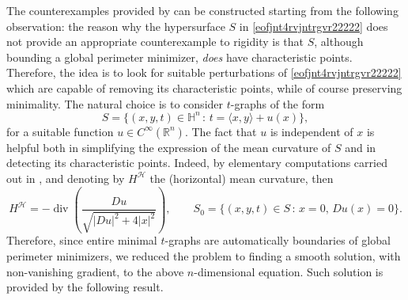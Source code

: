 \documentclass[11pt]{amsart}
\newcommand{\hhh}{{\mathcal{H}}}
\newcommand{\rr}{{\mathbb{R}}}
\newcommand{\hh}{{\mathbb{H}}}
\DeclareMathOperator{\divv}{div}
\theoremstyle{definition}
\theoremstyle{remark}
\numberwithin{equation}{section}
\begin{document}
The counterexamples provided by  can be constructed starting from the following observation: the reason why the hypersurface $S$ in \eqref{eofjnt4rvjntrgvr22222} does not provide an appropriate counterexample to rigidity is that $S$, although bounding a global perimeter minimizer,  \emph{does} have characteristic points. Therefore, the idea is to look for suitable perturbations of \eqref{eofjnt4rvjntrgvr22222} which are capable of removing its characteristic points, while of course preserving minimality. The natural choice is to consider $t$-graphs of the form 
\begin{equation}\label{eofjnt4rvjntrgvr}
   S=\{(x,y,t)\in\hh^n\,:\,t=\langle x, y\rangle+u(x)\},
\end{equation}
for a suitable function $u\in C^\infty(\rr^n)$. The fact that $u$ is independent of $x$ is helpful both in simplifying the expression of the mean curvature of $S$ and in detecting its characteristic points. Indeed, by elementary computations carried out in , and denoting by $H^\hhh$ the (horizontal) mean curvature, then
\begin{equation*}
    H^\hhh=-\divv\left(\frac{Du}{\sqrt{|Du|^2+4|x|^2}}\right),\qquad  S_0=\{(x,y,t)\in S\,:\,x=0,\,Du(x)=0\}.
\end{equation*}
Therefore, since entire minimal $t$-graphs are automatically boundaries of global perimeter minimizers, we reduced the problem to finding a smooth solution, with non-vanishing gradient, to the above $n$-dimensional equation. Such solution is provided by the following result. 
\end{document}
